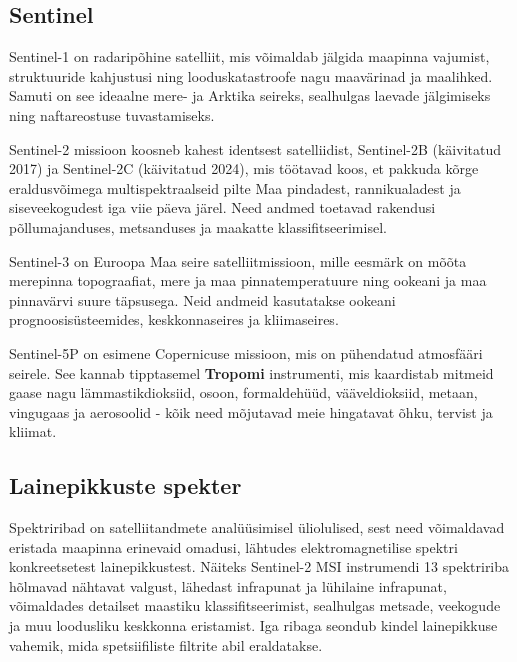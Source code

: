 \subsection{Sentinel}
Sentinel-1 on radaripõhine satelliit, mis võimaldab jälgida maapinna vajumist,
struktuuride kahjustusi ning looduskatastroofe nagu maavärinad ja maalihked. Samuti on
see ideaalne mere- ja Arktika seireks, sealhulgas laevade jälgimiseks ning
naftareostuse tuvastamiseks. \cite{S1Applications}

Sentinel-2 missioon koosneb kahest identsest satelliidist, Sentinel-2B
(käivitatud 2017) ja Sentinel-2C (käivitatud 2024), mis töötavad koos, et
pakkuda kõrge eraldusvõimega multispektraalseid pilte Maa pindadest,
rannikualadest ja siseveekogudest iga viie päeva järel. Need andmed toetavad
rakendusi põllumajanduses, metsanduses ja maakatte klassifitseerimisel. \cite{S2Applications}

Sentinel-3 on Euroopa Maa seire satelliitmissioon, mille eesmärk on mõõta
merepinna topograafiat, mere ja maa pinnatemperatuure ning ookeani ja maa
pinnavärvi suure täpsusega. Neid andmeid kasutatakse ookeani prognoosisüsteemides,
keskkonnaseires ja kliimaseires. \cite{S3Mission}

Sentinel-5P on esimene Copernicuse missioon, mis on pühendatud atmosfääri
seirele. See kannab tipptasemel \textbf{Tropomi} instrumenti, mis kaardistab mitmeid
gaase nagu lämmastikdioksiid, osoon, formaldehüüd, vääveldioksiid, metaan,
vingugaas ja aerosoolid - kõik need mõjutavad meie hingatavat õhku, tervist ja
kliimat. \cite{S5PApplications}
\subsection{Lainepikkuste spekter}
Spektriribad on satelliitandmete analüüsimisel üliolulised, sest need
võimaldavad eristada maapinna erinevaid omadusi, lähtudes elektromagnetilise
spektri konkreetsetest lainepikkustest. Näiteks Sentinel-2 MSI instrumendi 13
spektririba hõlmavad nähtavat valgust, lähedast infrapunat ja lühilaine
infrapunat, võimaldades detailset maastiku klassifitseerimist, sealhulgas
metsade, veekogude ja muu loodusliku keskkonna eristamist. Iga ribaga seondub
kindel lainepikkuse vahemik, mida spetsiifiliste filtrite abil eraldatakse. \cite{S2Mission}
\bigskip

